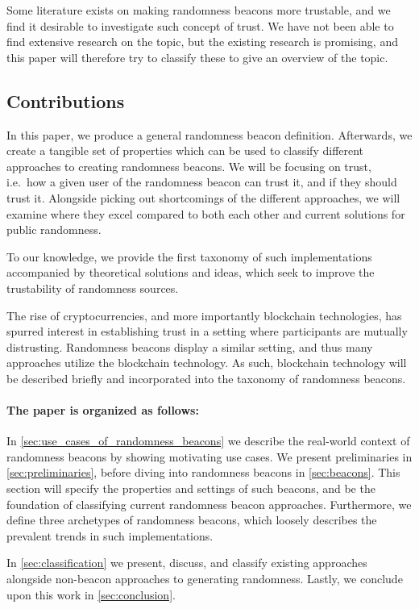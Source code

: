Some literature exists on making randomness beacons more trustable, and we find it desirable to investigate such concept of trust.
We have not been able to find extensive research on the topic, but the existing research is promising, and this paper will therefore try to classify these to give an overview of the topic.

\subsection*{Contributions}\label{subsec:contributions}
In this paper, we produce a general randomness beacon definition. Afterwards, we create a tangible set of properties which can be used to classify different approaches to creating randomness beacons.
We will be focusing on trust, i.e.\ how a given user of the randomness beacon can trust it, and if they should trust it.
Alongside picking out shortcomings of the different approaches, we will examine where they excel compared to both each other and current solutions for public randomness.

To our knowledge, we provide the first taxonomy of such implementations accompanied by theoretical solutions and ideas, which seek to improve the trustability of randomness sources.

The rise of cryptocurrencies, and more importantly blockchain technologies, has spurred interest in establishing trust in a setting where participants are mutually distrusting.
Randomness beacons display a similar setting, and thus many approaches utilize the blockchain technology.
As such, blockchain technology will be described briefly and incorporated into the taxonomy of randomness beacons.

\paragraph{The paper is organized as follows:}
In \cref{sec:use_cases_of_randomness_beacons} we describe the real-world context of randomness beacons by showing motivating use cases.
We present preliminaries in \cref{sec:preliminaries}, before diving into randomness beacons in \cref{sec:beacons}.
This section will specify the properties and settings of such beacons, and be the foundation of classifying current randomness beacon approaches.
Furthermore, we define three archetypes of randomness beacons, which loosely describes the prevalent trends in such implementations.

In \cref{sec:classification} we present, discuss, and classify existing approaches alongside non-beacon approaches to generating randomness.
Lastly, we conclude upon this work in \cref{sec:conclusion}.


